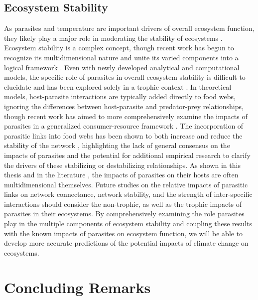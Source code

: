 \subsection{Ecosystem Stability}

As parasites and temperature are important drivers of overall ecosystem function, they likely play a major role in moderating the stability of ecosystems \citep{lafferty2008, jephcott2016}. Ecosystem stability is a complex concept, though recent work has begun to recognize its multidimensional nature and unite its varied components into a logical framework \citep{pimm1984, donohue2013, donohue2016, hillebrand2018}. Even with newly developed analytical and computational models, the specific role of parasites in overall ecosystem stability is difficult to elucidate and has been explored solely in a trophic context \citep{dunne2013}. In theoretical models, host-parasite interactions are typically added directly to food webs, ignoring the differences between host-parasite and predator-prey relationships, though recent work has aimed to more comprehensively examine the impacts of parasites in a generalized consumer-resource framework \citep{lafferty2015}. The incorporation of parasitic links into food webs has been shown to both increase and reduce the stability of the network \citep{wood2015}, highlighting the lack of general consensus on the impacts of parasites and the potential for additional empirical research to clarify the drivers of these stabilizing or destabilizing relationships. As shown in this thesis and in the literature \citep{perrot2014}, the impacts of parasites on their hosts are often multidimensional themselves. Future studies on the relative impacts of parasitic links on network connectance, network stability, and the strength of inter-specific interactions should consider the non-trophic, as well as the trophic impacts of parasites in their ecosystems. By comprehensively examining the role parasites play in the multiple components of ecosystem stability and coupling these results with the known impacts of parasites on ecosystem function, we will be able to develop more accurate predictions of the potential impacts of climate change on ecosystems.

\section{Concluding Remarks}


